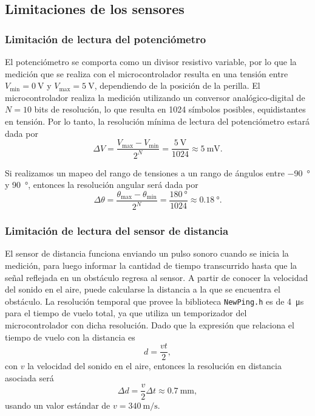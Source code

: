 \subsection{Limitaciones de los sensores}

\subsubsection{Limitación de lectura del potenciómetro}

El potenciómetro se comporta como un divisor resistivo variable, por lo que la medición que se realiza con el microcontrolador resulta en una tensión entre $V_{\min} = \qty{0}{\V}$ y $V_{\max} = \qty{5}{\V}$, dependiendo de la posición de la perilla. El microcontrolador realiza la medición utilizando un conversor analógico-digital de $N = 10$ bits de resolución, lo que resulta en 1024 símbolos posibles, equidistantes en tensión. Por lo tanto, la resolución mínima de lectura del potenciómetro estará dada por
\begin{equation*}
    \Delta V = \frac{V_{\max} - V_{\min}}{2^N} = \frac{\qty{5}{\V}}{1024} \approx \qty{5}{\mV}.
\end{equation*}

Si realizamos un mapeo del rango de tensiones a un rango de ángulos entre \qty{-90}{\degree} y \qty{90}{\degree}, entonces la resolución angular será dada por
\begin{equation*}
    \Delta \theta = \frac{\theta_{\max} - \theta_{\min}}{2^N} = \frac{\qty{180}{\degree}}{1024} \approx \qty{0.18}{\degree}.
\end{equation*}


\subsubsection{Limitación de lectura del sensor de distancia}

El sensor de distancia funciona enviando un pulso sonoro cuando se inicia la medición, para luego informar la cantidad de tiempo transcurrido hasta que la señal reflejada en un obstáculo regresa al sensor. A partir de conocer la velocidad del sonido en el aire, puede calcularse la distancia a la que se encuentra el obstáculo. La resolución temporal que provee la biblioteca \verb|NewPing.h| es de \qty{4}{\us} para el tiempo de vuelo total, ya que utiliza un temporizador del microcontrolador con dicha resolución. Dado que la expresión que relaciona el tiempo de vuelo con la distancia es
\begin{equation}
    d = \frac{v t}{2},
\end{equation}
con $v$ la velocidad del sonido en el aire, entonces la resolución en distancia asociada será
\begin{equation}
    \label{eq:dist-tiempo-errores}
    \Delta d = \frac{v}{2} \Delta t \approx \qty{0.7}{\mm},
\end{equation}
usando un valor estándar de $v = \qty{340}{\m\per\s}$.

